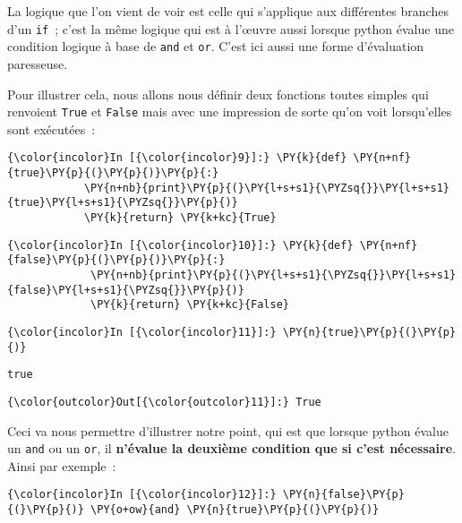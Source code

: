     La logique que l'on vient de voir est celle qui s'applique aux
différentes branches d'un \texttt{if}~; c'est la même logique qui est à
l'œuvre aussi lorsque python évalue une condition logique à base de
\texttt{and} et \texttt{or}. C'est ici aussi une forme d'évaluation
paresseuse.

    Pour illustrer cela, nous allons nous définir deux fonctions toutes
simples qui renvoient \texttt{True} et \texttt{False} mais avec une
impression de sorte qu'on voit lorsqu'elles sont exécutées~:

    \begin{Verbatim}[commandchars=\\\{\}]
{\color{incolor}In [{\color{incolor}9}]:} \PY{k}{def} \PY{n+nf}{true}\PY{p}{(}\PY{p}{)}\PY{p}{:}
            \PY{n+nb}{print}\PY{p}{(}\PY{l+s+s1}{\PYZsq{}}\PY{l+s+s1}{true}\PY{l+s+s1}{\PYZsq{}}\PY{p}{)}
            \PY{k}{return} \PY{k+kc}{True}
\end{Verbatim}


    \begin{Verbatim}[commandchars=\\\{\}]
{\color{incolor}In [{\color{incolor}10}]:} \PY{k}{def} \PY{n+nf}{false}\PY{p}{(}\PY{p}{)}\PY{p}{:}
             \PY{n+nb}{print}\PY{p}{(}\PY{l+s+s1}{\PYZsq{}}\PY{l+s+s1}{false}\PY{l+s+s1}{\PYZsq{}}\PY{p}{)}
             \PY{k}{return} \PY{k+kc}{False}
\end{Verbatim}


    \begin{Verbatim}[commandchars=\\\{\}]
{\color{incolor}In [{\color{incolor}11}]:} \PY{n}{true}\PY{p}{(}\PY{p}{)}
\end{Verbatim}


    \begin{Verbatim}[commandchars=\\\{\}]
true

    \end{Verbatim}

\begin{Verbatim}[commandchars=\\\{\}]
{\color{outcolor}Out[{\color{outcolor}11}]:} True
\end{Verbatim}
            
    Ceci va nous permettre d'illustrer notre point, qui est que lorsque
python évalue un \texttt{and} ou un \texttt{or}, il \textbf{n'évalue la
deuxième condition que si c'est nécessaire}. Ainsi par exemple~:

    \begin{Verbatim}[commandchars=\\\{\}]
{\color{incolor}In [{\color{incolor}12}]:} \PY{n}{false}\PY{p}{(}\PY{p}{)} \PY{o+ow}{and} \PY{n}{true}\PY{p}{(}\PY{p}{)}
\end{Verbatim}


